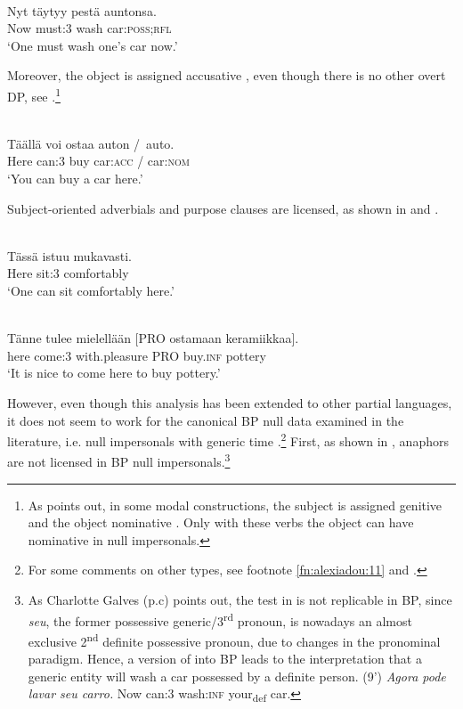 \documentclass[output=paper]{LSP/langsci}
\begin{document}
\ea\label{ex:9.alexiadou}
\\
\gll Nyt täytyy pestä auntonsa.\\
 Now must:3 wash car:\textsc{poss;rfl}\\
\glt ‘One must wash one’s car now.’
\z


Moreover, the object is assigned accusative , even though there is no other overt DP, see .\footnote{As \citet{Holmberg2005} points out, in some modal constructions, the subject is assigned genitive  and the object nominative . Only with these verbs the object can have nominative  in null impersonals.}

\ea\label{ex:10.alexiadou}
\\
\gll Täällä voi ostaa auton /\,{\upshape *} auto.\\
 Here can:3 buy car:\textsc{acc} / car:\textsc{nom}\\
\glt ‘You can buy a car here.’
\z


Subject-oriented adverbials and purpose clauses are licensed, as shown in  and .


\ea\label{ex:11.alexiadou}
\\
\gll Tässä istuu mukavasti.\\
 Here sit:3 comfortably\\
\glt ‘One can sit comfortably here.’
\z


\ea\label{ex:12.alexiadou}
\\
\gll Tänne tulee mielellään [PRO ostamaan keramiikkaa].\\
 here come:3  with.pleasure PRO buy.\textsc{inf} pottery\\
\glt ‘It is nice to come here to buy pottery.’
\z

However, even though this analysis has been extended to other partial  languages, it does not seem to work for the canonical BP null  data examined in the literature, i.e. null impersonals with generic time .\footnote{For some comments on other types, see footnote \ref{fn:alexiadou:11} and .} First, as shown in , anaphors are not licensed in BP null impersonals.\footnote{As Charlotte Galves (p.c) points out, the test in  is not replicable in BP, since \textit{seu}, the former possessive generic/3\textsuperscript{rd} pronoun, is nowadays an almost exclusive 2\textsuperscript{nd} definite possessive pronoun, due to changes in the pronominal paradigm. Hence, a version of  into BP leads to the interpretation that a generic entity will wash a car possessed by a definite person. (9’) \textit{Agora pode lavar seu carro.} Now can:3 wash:\textsc{inf} your\textsubscript{def} car.}
\end{document}
